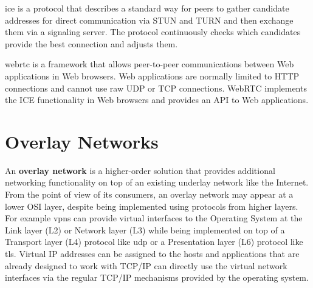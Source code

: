 
\gls{ice} is a protocol that describes a standard way for peers to gather candidate addresses for direct communication via STUN and TURN and then exchange them via a signaling server. The protocol continuously checks which candidates provide the best connection and adjusts them.

\gls{webrtc} is a framework that allows peer-to-peer communications between Web applications in Web browsers. Web applications are normally limited to HTTP connections and cannot use raw UDP or TCP connections. WebRTC implements the ICE functionality in Web browsers and provides an API to Web applications.


\label{thesis__022-overlays.md}
\chapter{Overlay Networks}\label{thesis__022-overlays.md__sec:overlays}

An \textbf{overlay network} is a higher-order solution that provides additional networking functionality on top of an existing underlay network like the Internet. From the point of view of its consumers, an overlay network may appear at a lower OSI layer, despite being implemented using protocols from higher layers. For example \glspl{vpn} can provide virtual interfaces to the Operating System at the Link layer (L2) or Network layer (L3) while being implemented on top of a Transport layer (L4) protocol like \gls{udp} or a Presentation layer (L6) protocol like \gls{tls}. Virtual IP addresses can be assigned to the hosts and applications that are already designed to work with TCP/IP can directly use the virtual network interfaces via the regular TCP/IP mechanisms provided by the operating system.

